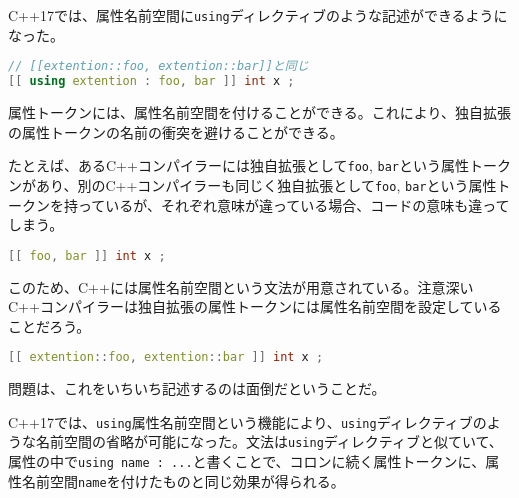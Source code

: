 %

C++17では、属性名前空間に\lstinline!using!ディレクティブのような記述ができるようになった。

\begin{lstlisting}[language=C++]
// [[extention::foo, extention::bar]]と同じ
[[ using extention : foo, bar ]] int x ;
\end{lstlisting}

属性トークンには、属性名前空間を付けることができる。これにより、独自拡張の属性トークンの名前の衝突を避けることができる。

たとえば、あるC++コンパイラーには独自拡張として\lstinline!foo!,
\lstinline!bar!という属性トークンがあり、別のC++コンパイラーも同じく独自拡張として\lstinline!foo!,
\lstinline!bar!という属性トークンを持っているが、それぞれ意味が違っている場合、コードの意味も違ってしまう。

\begin{lstlisting}[language=C++]
[[ foo, bar ]] int x ;
\end{lstlisting}

このため、C++には属性名前空間という文法が用意されている。注意深いC++コンパイラーは独自拡張の属性トークンには属性名前空間を設定していることだろう。

\begin{lstlisting}[language=C++]
[[ extention::foo, extention::bar ]] int x ;
\end{lstlisting}

問題は、これをいちいち記述するのは面倒だということだ。

C++17では、\lstinline!using!属性名前空間という機能により、\lstinline!using!ディレクティブのような名前空間の省略が可能になった。文法は\lstinline!using!ディレクティブと似ていて、属性の中で\lstinline!using name : ...!と書くことで、コロンに続く属性トークンに、属性名前空間\lstinline!name!を付けたものと同じ効果が得られる。
